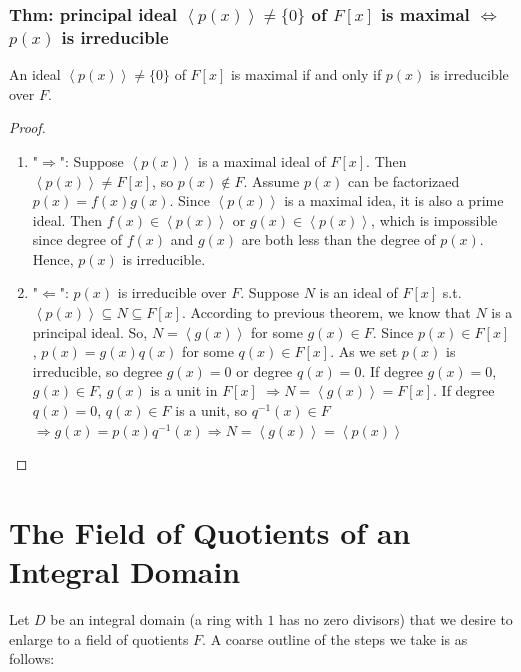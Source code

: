 \documentclass[11pt]{elegantbook}
\begin{document}
\subsection{Thm: principal ideal $\left\langle p(x)\right\rangle\neq \{0\}$ of $F[x]$ is maximal $\Leftrightarrow$ $p(x)$ is irreducible}
\begin{theorem}
    An ideal $\left\langle p(x)\right\rangle\neq \{0\}$ of $F[x]$ is maximal if and only if $p(x)$ is irreducible over $F$.
\end{theorem}
\begin{proof}\quad
    \begin{enumerate}
        \item "$\Rightarrow$": Suppose $\left\langle p(x)\right\rangle$ is a maximal ideal of $F[x]$. Then $\left\langle p(x)\right\rangle\neq F[x]$, so $p(x)\notin F$. Assume $p(x)$ can be factorizaed $p(x)=f(x)g(x)$. Since $\left\langle p(x)\right\rangle$ is a maximal idea, it is also a prime ideal. Then $f(x)\in \left\langle p(x)\right\rangle$ or $g(x)\in \left\langle p(x)\right\rangle$, which is impossible since degree of $f(x)$ and $g(x)$ are both less than the degree of $p(x)$. Hence, $p(x)$ is irreducible.
        \item "$\Leftarrow$": $p(x)$ is irreducible over $F$. Suppose $N$ is an ideal of $F[x]$ s.t. $\left\langle p(x)\right\rangle\subseteq N\subseteq F[x]$. According to previous theorem, we know that $N$ is a principal ideal. So, $N=\left\langle g(x)\right\rangle$ for some $g(x)\in F$. Since $p(x)\in F[x]$, $p(x)=g(x)q(x)$ for some $q(x)\in F[x]$. As we set $p(x)$ is irreducible, so degree $g(x)=0$ or degree $q(x)=0$. If degree $g(x)=0$, $g(x)\in F$, $g(x)$ is a unit in $F[x]$ $\Rightarrow N=\left\langle g(x)\right\rangle=F[x]$. If degree $q(x)=0$, $q(x)\in F$ is a unit, so $q^{-1}(x)\in F$ $\Rightarrow g(x)=p(x)q^{-1}(x) \Rightarrow N=\left\langle g(x)\right\rangle = \left\langle p(x)\right\rangle$
    \end{enumerate}
\end{proof}















\chapter{The Field of Quotients of an Integral Domain}
Let $D$ be an integral domain (a ring with $1$ has no zero divisors) that we desire to enlarge to a field of quotients $F$. A coarse
outline of the steps we take is as follows:
\end{document}
